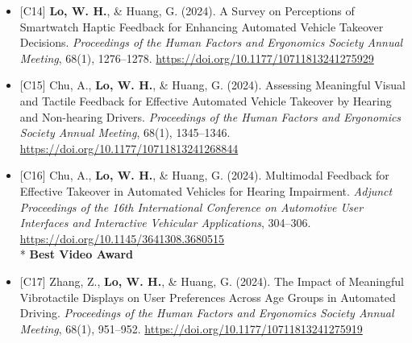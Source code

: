 \documentclass[11pt]{article}
\begin{document}
\begin{itemize}[leftmargin=*, topsep=0pt, itemsep=6pt]
  \item \begin{samepage}{[C14]} \textbf{Lo, W. H.}, \& Huang, G. (2024). A Survey on Perceptions of Smartwatch Haptic Feedback for Enhancing Automated Vehicle Takeover Decisions. \textit{Proceedings of the Human Factors and Ergonomics Society Annual Meeting}, 68(1), 1276--1278. \href{https://doi.org/10.1177/10711813241275929}{\url{https://doi.org/10.1177/10711813241275929}}
  \par\end{samepage}

  \item \begin{samepage}{[C15]} Chu, A., \textbf{Lo, W. H.}, \& Huang, G. (2024). Assessing Meaningful Visual and Tactile Feedback for Effective Automated Vehicle Takeover by Hearing and Non-hearing Drivers. \textit{Proceedings of the Human Factors and Ergonomics Society Annual Meeting}, 68(1), 1345--1346. \href{https://doi.org/10.1177/10711813241268844}{\url{https://doi.org/10.1177/10711813241268844}}
  \par\end{samepage}

  \item \begin{samepage}{[C16]} Chu, A., \textbf{Lo, W. H.}, \& Huang, G. (2024). Multimodal Feedback for Effective Takeover in Automated Vehicles for Hearing Impairment. \textit{Adjunct Proceedings of the 16th International Conference on Automotive User Interfaces and Interactive Vehicular Applications}, 304--306. \href{https://doi.org/10.1145/3641308.3680515}{\url{https://doi.org/10.1145/3641308.3680515}}\\* \textbf{Best Video Award}
  \par\end{samepage}

  \item \begin{samepage}{[C17]} Zhang, Z., \textbf{Lo, W. H.}, \& Huang, G. (2024). The Impact of Meaningful Vibrotactile Displays on User Preferences Across Age Groups in Automated Driving. \textit{Proceedings of the Human Factors and Ergonomics Society Annual Meeting}, 68(1), 951--952. \href{https://doi.org/10.1177/10711813241275919}{\url{https://doi.org/10.1177/10711813241275919}}
  \par\end{samepage}

\end{itemize}
\end{document}

